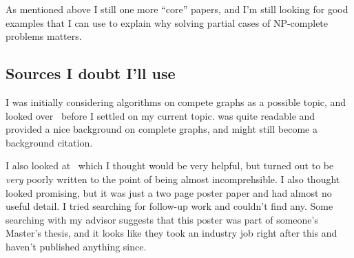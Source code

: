 \documentclass{sig-alternate}
\begin{document}
As mentioned above I still one more ``core'' papers, and I'm still looking for good examples that I can use to explain why solving partial cases of NP-complete problems matters.

\subsection{Sources I doubt I'll use}

I was initially considering algorithms on compete graphs as a possible topic, and looked over~\cite{winkler1984isometric, dobkin1987delaunay, folkman1970graphs} before I settled on my current topic. \cite{winkler1984isometric} was quite readable and provided a nice background on complete graphs, and might still become a background citation.

I also looked at~\cite{trulyFrightening2011} which I thought would be very helpful, but turned out to be \emph{very} poorly written to the point of being almost incomprehsible. I also thought~\cite{littlePoster2013} looked promising, but it was just a two page poster paper and had almost no useful detail. I tried searching for follow-up work and couldn't find any. Some searching with my advisor suggests that this poster was part of someone's Master's thesis, and it looks like they took an industry job right after this and haven't published anything since.


  

\end{document}
